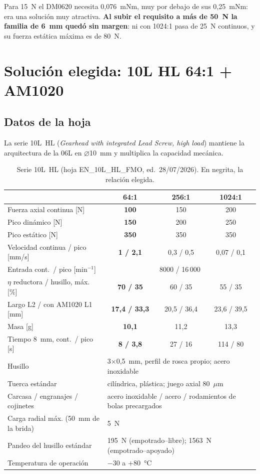 \documentclass[11pt,a4paper]{article}
\begin{document}
Para 15~N el DM0620 necesita 0,076~mNm, muy por debajo de sus 0,25~mNm: era una solución muy atractiva.
\textbf{Al subir el requisito a más de 50~N la familia de 6~mm quedó sin margen}: ni con 1024:1 pasa de
25~N continuos, y su fuerza estática máxima es de 80~N.

\section{Solución elegida: 10L HL 64:1 + AM1020}

\subsection{Datos de la hoja}
La serie 10L~HL (\emph{Gearhead with integrated Lead Screw, high load}) mantiene la arquitectura de la
06L en $\varnothing$10~mm y multiplica la capacidad mecánica.

\begin{table}[H]\centering\small
\caption{Serie 10L~HL (hoja EN\_10L\_HL\_FMO, ed.\ 28/07/2026). En negrita, la relación elegida.}
\label{tab:10lhl}
\begin{tabular}{l c c c}
\toprule
 & \textbf{64:1} & 256:1 & 1024:1\\
\midrule
Fuerza axial continua [N]                 & \textbf{100} & 150 & 200\\
Pico dinámico [N]                         & \textbf{150} & 200 & 250\\
Pico estático [N]                         & \textbf{350} & 350 & 350\\
Velocidad continua / pico [mm/s]          & \textbf{1 / 2,1} & 0,3 / 0,5 & 0,07 / 0,1\\
Entrada cont.\ / pico [min$^{-1}$] & \multicolumn{3}{c}{8000 / 16\,000}\\
$\eta$ reductora / husillo, máx. [\%] & \textbf{70 / 35} & 60 / 35 & 55 / 35\\
Largo L2 / con AM1020 L1 [mm]   & \textbf{17,4 / 33,3} & 20,5 / 36,4 & 23,6 / 39,5\\
Masa [g]                                  & \textbf{10,1} & 11,2 & 13,3\\
Tiempo 8~mm, cont.\ / pico [s]     & \textbf{8 / 3,8} & 27 / 16 & 114 / 80\\
\midrule
Husillo & \multicolumn{3}{l}{3$\times$0,5~mm, perfil de rosca propio; acero inoxidable}\\
Tuerca estándar & \multicolumn{3}{l}{cilíndrica, plástica; juego axial 80~$\mu$m}\\
Carcasa / engranajes / cojinetes & \multicolumn{3}{l}{acero inoxidable / acero / rodamientos de bolas precargados}\\
Carga radial máx. (50~mm de la brida) & \multicolumn{3}{l}{5~N}\\
Pandeo del husillo estándar & \multicolumn{3}{l}{195~N (empotrado--libre); 1563~N (empotrado--apoyado)}\\
Temperatura de operación & \multicolumn{3}{l}{$-30$ a $+80$~°C}\\
\bottomrule
\end{tabular}
\end{table}
\end{document}
